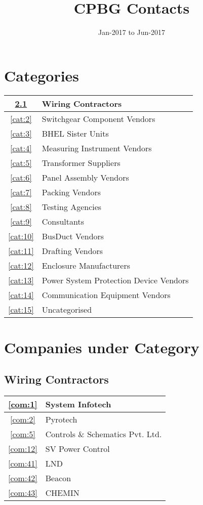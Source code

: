 \documentclass[a4paper, 11pt, twoside]{book}
\title{CPBG Contacts}
\author{Jan-2017 to Jun-2017}
\begin{document}
\maketitle
\tableofcontents
\chapter{Categories}
\begin{tabular}{|c|l|}
\hline
\ref{cat:1} & {Wiring Contractors} \\ \hline
\ref{cat:2} & {Switchgear Component Vendors} \\ \hline
\ref{cat:3} & {BHEL Sister Units} \\ \hline
\ref{cat:4} & {Measuring Instrument Vendors} \\ \hline
\ref{cat:5} & {Transformer Suppliers} \\ \hline
\ref{cat:6} & {Panel Assembly Vendors} \\ \hline
\ref{cat:7} & {Packing Vendors} \\ \hline
\ref{cat:8} & {Testing Agencies} \\ \hline
\ref{cat:9} & {Consultants} \\ \hline
\ref{cat:10} & {BusDuct Vendors} \\ \hline
\ref{cat:11} & {Drafting Vendors} \\ \hline
\ref{cat:12} & {Enclosure Manufacturers} \\ \hline
\ref{cat:13} & {Power System Protection Device Vendors} \\ \hline
\ref{cat:14} & {Communication Equipment Vendors} \\ \hline
\ref{cat:15} & {Uncategorised} \\ \hline
\end{tabular}
\chapter{Companies under Category}
\section{Wiring Contractors}\label{cat:1}
\begin{tabular}{|c|l|}
\hline
\ref{com:1} & System Infotech \\ \hline
\ref{com:2} & Pyrotech \\ \hline
\ref{com:5} & Controls \& Schematics Pvt. Ltd. \\ \hline
\ref{com:12} & SV Power Control \\ \hline
\ref{com:41} & LND \\ \hline
\ref{com:42} & Beacon \\ \hline
\ref{com:43} & CHEMIN \\ \hline
\end{tabular}
\end{document}
